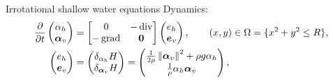 \documentclass[aspectratio=169]{ISAE-Beamer}
\DeclareMathOperator*{\grad}{grad}
\renewcommand{\div}{\operatorname{div}}
\newcommand*{\norm}[1]{\ensuremath{\left\|#1\right\|}}
\begin{document}
\begin{frame}{Irrotational shallow water equations}
	Dynamics:
	\begin{equation*} 
		\begin{aligned}
			\diffp{}{t}
			\begin{pmatrix}
				\alpha_h \\
				\bm{\alpha}_v \\
			\end{pmatrix} &= 
			\begin{bmatrix}
				0 & -\div \\
				-\grad & \bm{0}
			\end{bmatrix}
			\begin{pmatrix}
				e_h\\
				\bm{e}_v\\
			\end{pmatrix}, \qquad (x,y) \in \Omega = \{x^2 + y^2 \le R \}, \\
			\begin{pmatrix}
				e_h\\
				\bm{e}_v\\
			\end{pmatrix} &= \begin{pmatrix}
				\delta_{\alpha_h} H\\
				\delta_{\bm{\alpha}_v} H\\
			\end{pmatrix} = 
			\begin{pmatrix}
				\frac{1}{2 \rho} \norm{\bm{\alpha}_v}^2 + \rho g \alpha_h \\
				\frac{1}{\rho} \alpha_h \bm{\alpha}_v
			\end{pmatrix}, 
		\end{aligned}
	\end{equation*}
	
\end{frame}
\end{document}
